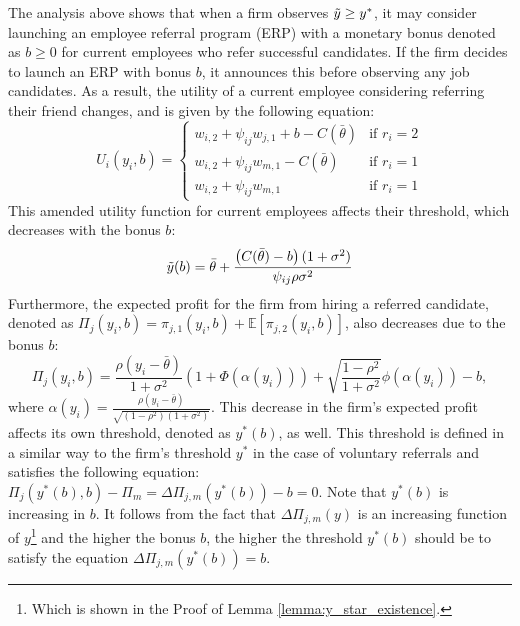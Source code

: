 \documentclass[12pt]{article}
\begin{document}
The analysis above shows that when a firm observes $\Tilde{y} \geq y^*$, it may consider launching an employee referral program (ERP) with a monetary bonus denoted as $b \geq 0$ for current employees who refer successful candidates. If the firm decides to launch an ERP with bonus $b$, it announces this before observing any job candidates. As a result, the utility of a current employee considering referring their friend changes, and is given by the following equation:
\begin{equation}
        U_{i}(y_i, b) = 
        \begin{cases}
		w_{i,2} + \psi_{ij} w_{j,1}+ b - C(\bar{\theta}) & \text{if } r_i = 2 \\ %
		w_{i,2} + \psi_{ij} w_{m,1} - C(\bar{\theta}) & \text{if } r_i = 1 \\
        w_{i,2} + \psi_{ij} w_{m,1} & \text{if } r_i = 1
        \end{cases}
\end{equation}
This amended utility function for current employees affects their threshold, which decreases with the bonus $b$:
\begin{equation}\label{eq_tilde_y_b}
    \Tilde{y}(b) = \bar{\theta}+\frac{\left(C(\bar{\theta})-b\right)(1+\sigma^2)}{\psi_{ij}\rho\sigma^2}
\end{equation}
Furthermore, the expected profit for the firm from hiring a referred candidate, denoted as $\Pi_j(y_i,b) = \pi_{j,1}(y_i, b)+ \mathbb{E}[\pi_{j,2}(y_i,b)]$, also decreases due to the bonus $b$:
\begin{equation}
\Pi_j(y_i, b)
= \frac{\rho\left(y_i-\bar{\theta}\right)}{1+\sigma^2}\left(1+\Phi\left(\alpha(y_i)\right)\right)
+ \sqrt{\frac{1-\rho^2}{1+\sigma^2}}\phi\left(\alpha(y_i)\right)-b,
\end{equation}
where $\alpha(y_i) = \frac{\rho\left(y_i - \bar{\theta}\right)}{\sqrt{(1-\rho^2)(1+\sigma^2)}}$. This decrease in the firm's expected profit affects its own threshold, denoted as $y^*(b)$, as well. This threshold is defined in a similar way to the firm's threshold $y^*$ in the case of voluntary referrals and satisfies the following equation: $\Pi_j(y^*(b),b) - \Pi_m = \Delta\Pi_{j,m}\left(y^*(b)\right)-b = 0$. Note that $y^*(b)$ is increasing in $b$. It follows from the fact that $\Delta\Pi_{j,m}(y)$ is an increasing function of $y$\footnote{Which is shown in the Proof of Lemma \ref{lemma:y_star_existence}.} and the higher the bonus $b$, the higher the threshold $y^*(b)$ should be to satisfy the equation $\Delta\Pi_{j,m}\left(y^*(b)\right)=b$.
\end{document}
